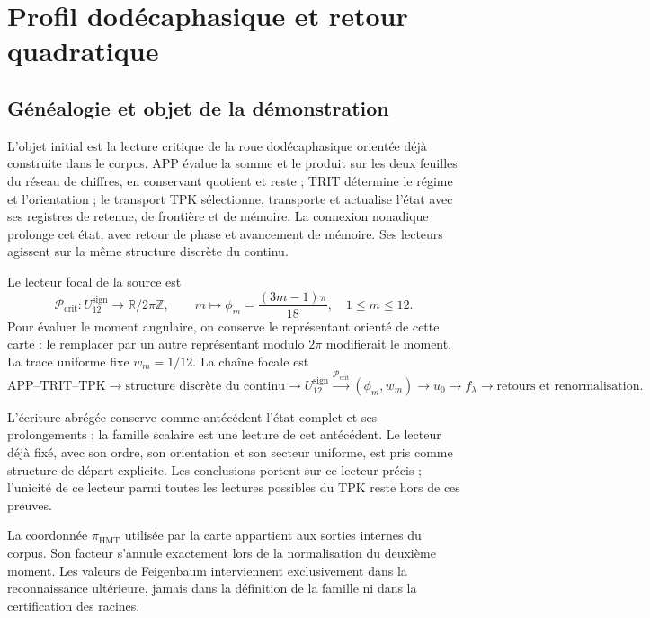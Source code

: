 \section{Profil dodécaphasique et retour quadratique}
\label{hmtfg:fragmento:perfil-dodecafasico-y-retorno-cuadratico}

\subsection{Généalogie et objet de la démonstration}
\label{hmtfg:desarrollo:1}

L’objet initial est la lecture critique de la roue dodécaphasique orientée déjà construite dans le corpus. APP évalue la somme et le produit sur les deux feuilles du réseau de chiffres, en conservant quotient et reste ; TRIT détermine le régime et l’orientation ; le transport TPK sélectionne, transporte et actualise l’état avec ses registres de retenue, de frontière et de mémoire. La connexion nonadique prolonge cet état, avec retour de phase et avancement de mémoire. Ses lecteurs agissent sur la même structure discrète du continu.

Le lecteur focal de la source est
\[
\mathcal P_{\mathrm{crit}}:U_{12}^{\mathrm{sign}}\longrightarrow
\mathbb R/2\pi\mathbb Z,\qquad
m\longmapsto\phi_m=\frac{(3m-1)\pi}{18},\quad 1\le m\le12.
\]
Pour évaluer le moment angulaire, on conserve le représentant orienté de cette carte : le remplacer par un autre représentant modulo \(2\pi\) modifierait le moment. La trace uniforme fixe \(w_m=1/12\). La chaîne focale est
\[
\text{APP–TRIT–TPK}\longrightarrow
\text{structure discrète du continu}\longrightarrow U_{12}^{\mathrm{sign}}
\xrightarrow{\mathcal P_{\mathrm{crit}}}(\phi_m,w_m)
\longrightarrow u_0\longrightarrow f_\lambda
\longrightarrow\text{retours et renormalisation}.
\]

L’écriture abrégée conserve comme antécédent l’état complet et ses prolongements ; la famille scalaire est une lecture de cet antécédent. Le lecteur déjà fixé, avec son ordre, son orientation et son secteur uniforme, est pris comme structure de départ explicite. Les conclusions portent sur ce lecteur précis ; l’unicité de ce lecteur parmi toutes les lectures possibles du TPK reste hors de ces preuves.

La coordonnée \(\pi_{\mathrm{HMT}}\) utilisée par la carte appartient aux sorties internes du corpus. Son facteur s’annule exactement lors de la normalisation du deuxième moment. Les valeurs de Feigenbaum interviennent exclusivement dans la reconnaissance ultérieure, jamais dans la définition de la famille ni dans la certification des racines.


